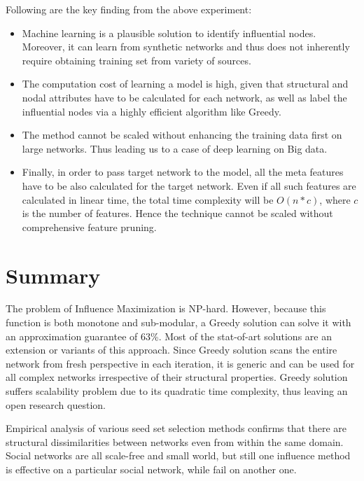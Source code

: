 		Following are the key finding from the above experiment:
		\begin{itemize}
			\item Machine learning is a plausible solution to identify influential nodes. Moreover, it can learn from synthetic networks and thus does not inherently require obtaining training set from variety of sources.
			
			\item The computation cost of learning a model is high, given that structural and nodal attributes have to be calculated for each network, as well as label the influential nodes via a highly efficient algorithm like Greedy.
			
			\item The method cannot be scaled without enhancing the training data first on large networks. Thus leading us to a case of deep learning on Big data.
			
			\item Finally, in order to pass target network to the model, all the meta features have to be also calculated for the target network. Even if all such features are calculated in linear time, the total time complexity will be $O(n*c)$, where $c$ is the number of features. Hence the technique cannot be scaled without comprehensive feature pruning.
		\end{itemize}	
		

	\section{Summary}
	\label{sec:inf-max-summary}
	The problem of Influence Maximization is NP-hard. However, because this function is both monotone and sub-modular, a Greedy solution can solve it with an approximation guarantee of 63\%. Most of the stat-of-art solutions are an extension or variants of this approach. Since Greedy solution scans the entire network from fresh perspective in each iteration, it is generic and can be used for all complex networks irrespective of their structural properties. Greedy solution suffers scalability problem due to its quadratic time complexity, thus leaving an open research question.
	
	
	Empirical analysis of various seed set selection methods confirms that there are structural dissimilarities between networks even from within the same domain. Social networks are all scale-free and small world, but still one influence method is effective on a particular social network, while fail on another one.
	
